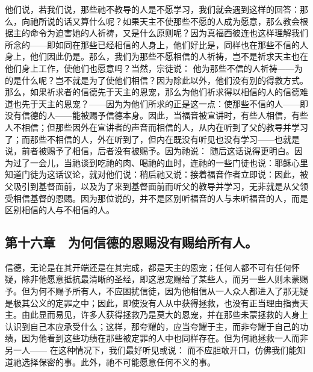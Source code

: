 他们说，若我们说，那些祂不教导的人是不愿学习，我们就会遇到这样的回答：那么，向祂所说的话又算什么呢？如果天主不使那些不愿的人成为愿意，那么教会根据主的命令为迫害她的人祈祷，又是什么原则呢？因为真福西彼连也这样理解我们所念的——即如同在那些已经相信的人身上，他们好比是，同样也在那些不信的人身上，他们因此仍是。那么，我们为那些不愿相信的人祈祷，岂不是祈求天主也在他们身上工作，使他们也愿意吗？当然，宗徒说： 他为那些不信的人祈祷——为的是什么呢？岂不就是为了使他们相信？因为除此以外，他们没有别的得救方式。那么，如果祈求者的信德先于天主的恩宠，那么为他们祈求得以相信的人的信德难道也先于天主的恩宠？——因为为他们所求的正是这一点：使那些不信的人——即没有信德的人——能被赐予信德本身。因此，当福音被宣讲时，有些人相信，有些人不相信；但那些因外在宣讲者的声音而相信的人，从内在听到了父的教导并学习了；而那些不相信的人，外在听到了，但内在既没有听见也没有学习——也就是说，前者被赐予了相信，后者没有被赐予。因为祂说： 随后这话说得更明白。因为过了一会儿，当祂谈到吃祂的肉、喝祂的血时，连祂的一些门徒也说：耶稣心里知道门徒为这话议论，就对他们说：稍后祂又说：接着福音作者立即说：因此，被父吸引到基督面前，以及为了来到基督面前而听父的教导并学习，无非就是从父领受相信基督的恩赐。因为那位说的，并不是区别听福音的人与未听福音的人，而是区别相信的人与不相信的人。\par


\subsection{第十六章　为何信德的恩赐没有赐给所有人。}

信德，无论是在其开端还是在其完成，都是天主的恩宠；任何人都不可有任何怀疑，除非他愿意抵抗最清晰的圣经，即这恩宠赐给了某些人，而另一些人则未蒙赐予。但为何不赐予所有人，不应困扰信徒，因为他相信从一人众人都进入了那无疑是极其公义的定罪之中；因此，即使没有人从中获得拯救，也没有正当理由指责天主。由此显而易见，许多人获得拯救乃是莫大的恩宠，并在那些未蒙拯救的人身上认识到自己本应承受什么；这样，那夸耀的，应当夸耀于主，而非夸耀于自己的功绩，因为他看到这些功绩在那些被定罪的人中也同样存在。但为何祂拯救一人而非另一人—— 在这种情况下，我们最好听见或说： 而不应胆敢开口，仿佛我们能知道祂选择保密的事。此外，祂不可能愿意任何不义的事。\par

